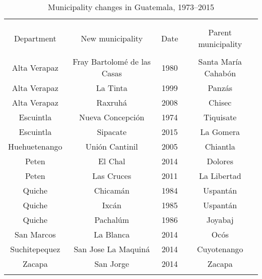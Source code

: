 \documentclass[a4paper, 12pt, notitlepage]{article}
\begin{document}
\begin{table}[!htbp] \centering
  \caption{Municipality changes in Guatemala, 1973--2015}
  \label{tab-app:muni}
  \small
  \begin{tabular}{cccc}
  \\[-1.8ex]\hline
  \hline \\[-1.8ex]
  \\[-1.8ex]
  Department      & New municipality                & Date      & Parent municipality \\
  \hline \\[-1.8ex]
  Alta Verapaz    & Fray Bartolomé de las Casas     & 1980      & Santa María Cahabón \\
  Alta Verapaz    &                    La Tinta     & 1999      &              Panzás \\
  Alta Verapaz    &                     Raxruhá     & 2008      &              Chisec \\
  Escuintla       &            Nueva Concepción     & 1974      &           Tiquisate \\
  Escuintla       &                    Sipacate     & 2015      &           La Gomera \\
  Huehuetenango   &              Unión Cantinil     & 2005      &            Chiantla \\
  Peten           &                     El Chal     & 2014      &             Dolores \\
  Peten           &                  Las Cruces     & 2011      &         La Libertad \\
  Quiche          &                    Chicamán     & 1984      &            Uspantán \\
  Quiche          &                       Ixcán     & 1985      &            Uspantán \\
  Quiche          &                    Pachalúm     & 1986      &             Joyabaj \\
  San Marcos      &                   La Blanca     & 2014      &                Ocós \\
  Suchitepequez   &         San Jose La Maquiná     & 2014      &         Cuyotenango \\
  Zacapa          &                   San Jorge     & 2014      &              Zacapa \\
  \hline
  \hline \\[-1.8ex]
  \end{tabular}
\end{table}
\end{document}
